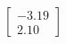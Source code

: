 \documentclass[preview]{standalone}
\begin{document}
\begin{align*}
\begin{bmatrix} -3.19 \\ 2.10 \end{bmatrix}
\end{align*}
\end{document}
